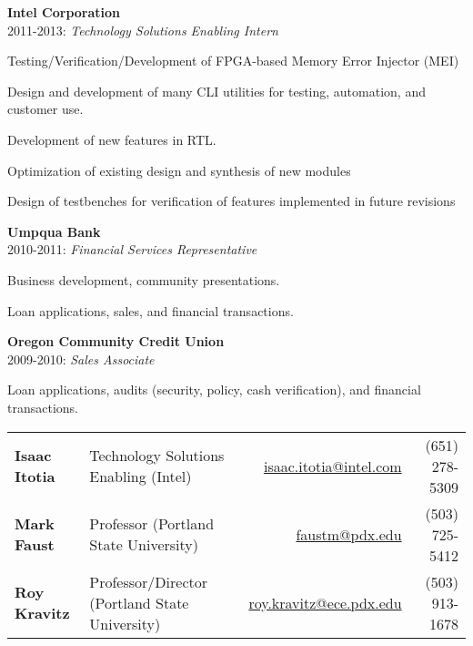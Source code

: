 \documentclass{article}
\begin{document}
	\hspace{-10pt}
	\textbf{Intel Corporation}\\2011-2013: \textit{Technology Solutions Enabling Intern}
	\begin{tight}
			\item Testing/Verification/Development of FPGA-based Memory Error Injector (MEI)
		\item Design and development of many CLI utilities for testing, automation, and customer use.
		\item Development of new features in RTL.  %
		\item Optimization of existing design and synthesis of new modules
		\item Design of testbenches for verification of features implemented in future revisions
	\end{tight} 

	\textbf{Umpqua Bank}\\2010-2011: \textit{Financial Services Representative}
	\begin{tight}
		\item Business development, community presentations.
		\item Loan applications, sales, and financial transactions.
	\end{tight}

	\textbf{Oregon Community Credit Union}\\ 2009-2010: \textit{Sales Associate}
	\begin{tight}
		\item Loan applications, audits (security, policy, cash verification), and financial transactions.
	\end{tight}


\vspace*{-9pt}
\begin{tabular}{llrr}
	\textbf{Isaac Itotia} & Technology Solutions Enabling (Intel) & \url{isaac.itotia@intel.com} & (651) 278-5309 \\
	\textbf{Mark Faust} & Professor (Portland State University) & \url{faustm@pdx.edu} & (503) 725-5412\\
	\textbf{Roy Kravitz} & Professor/Director (Portland State University) & \url{roy.kravitz@ece.pdx.edu} & (503) 913-1678\\ 
\end{tabular}
\end{document}
